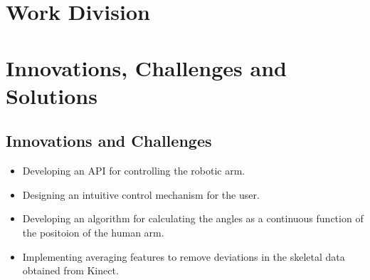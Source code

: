 \documentclass[a4paper,11pt]{article}
\begin{document}
\newpage
\section{Work Division}
\begin{table}[h]
\setlength{\tabcolsep}{10pt}
\noindent{}
\end{table}







\section{Innovations, Challenges and Solutions}
\subsection{Innovations and Challenges}
\begin{itemize}
\item Developing an API for controlling the robotic arm. 
\item Designing an intuitive control mechanism for the user.
\item Developing an algorithm for calculating the angles as a continuous function of the positoion of the human arm.
\item Implementing averaging features to remove deviations in the skeletal data obtained from Kinect.
\end{itemize}
\end{document}
